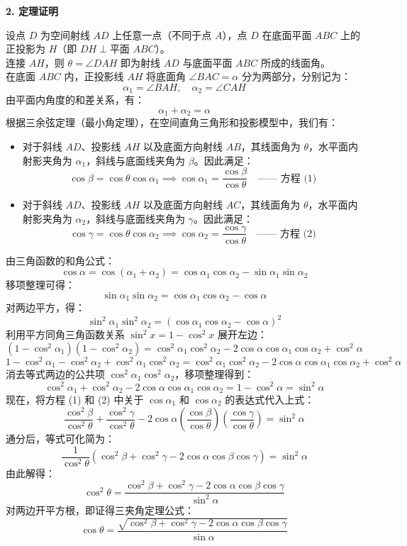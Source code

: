 \documentclass[11pt,a4paper]{ctexart}
\begin{document}
\noindent\textbf{2. 定理证明}\par
设点 $D$ 为空间射线 $AD$ 上任意一点（不同于点 $A$），点 $D$ 在底面平面 $ABC$ 上的正投影为 $H$（即 $DH \perp \text{平面 } ABC$）。\\
连接 $AH$，则 $\theta = \angle DAH$ 即为射线 $AD$ 与底面平面 $ABC$ 所成的线面角。\\
在底面 $ABC$ 内，正投影线 $AH$ 将底面角 $\angle BAC = \alpha$ 分为两部分，分别记为：
\[ \alpha_1 = \angle BAH, \quad \alpha_2 = \angle CAH \]
由平面内角度的和差关系，有：
\[ \alpha_1 + \alpha_2 = \alpha \]
根据三余弦定理（最小角定理），在空间直角三角形和投影模型中，我们有：
\begin{itemize}
    \item 对于斜线 $AD$、投影线 $AH$ 以及底面方向射线 $AB$，其线面角为 $\theta$，水平面内射影夹角为 $\alpha_1$，斜线与底面线夹角为 $\beta$。因此满足：
    \[ \cos\beta = \cos\theta \cos\alpha_1 \implies \cos\alpha_1 = \frac{\cos\beta}{\cos\theta} \quad \text{—— 方程 (1)} \]
    \item 对于斜线 $AD$、投影线 $AH$ 以及底面方向射线 $AC$，其线面角为 $\theta$，水平面内射影夹角为 $\alpha_2$，斜线与底面线夹角为 $\gamma$。因此满足：
    \[ \cos\gamma = \cos\theta \cos\alpha_2 \implies \cos\alpha_2 = \frac{\cos\gamma}{\cos\theta} \quad \text{—— 方程 (2)} \]
\end{itemize}
由三角函数的和角公式：
\[ \cos\alpha = \cos(\alpha_1 + \alpha_2) = \cos\alpha_1 \cos\alpha_2 - \sin\alpha_1 \sin\alpha_2 \]
移项整理可得：
\[ \sin\alpha_1 \sin\alpha_2 = \cos\alpha_1 \cos\alpha_2 - \cos\alpha \]
对两边平方，得：
\[ \sin^2\alpha_1 \sin^2\alpha_2 = (\cos\alpha_1 \cos\alpha_2 - \cos\alpha)^2 \]
利用平方同角三角函数关系 $\sin^2 x = 1 - \cos^2 x$ 展开左边：
\[ (1 - \cos^2\alpha_1)(1 - \cos^2\alpha_2) = \cos^2\alpha_1 \cos^2\alpha_2 - 2\cos\alpha \cos\alpha_1 \cos\alpha_2 + \cos^2\alpha \]
\[ 1 - \cos^2\alpha_1 - \cos^2\alpha_2 + \cos^2\alpha_1 \cos^2\alpha_2 = \cos^2\alpha_1 \cos^2\alpha_2 - 2\cos\alpha \cos\alpha_1 \cos\alpha_2 + \cos^2\alpha \]
消去等式两边的公共项 $\cos^2\alpha_1 \cos^2\alpha_2$，移项整理得到：
\[ \cos^2\alpha_1 + \cos^2\alpha_2 - 2\cos\alpha \cos\alpha_1 \cos\alpha_2 = 1 - \cos^2\alpha = \sin^2\alpha \]
现在，将方程 (1) 和 (2) 中关于 $\cos\alpha_1$ 和 $\cos\alpha_2$ 的表达式代入上式：
\[ \frac{\cos^2\beta}{\cos^2\theta} + \frac{\cos^2\gamma}{\cos^2\theta} - 2\cos\alpha \left(\frac{\cos\beta}{\cos\theta}\right) \left(\frac{\cos\gamma}{\cos\theta}\right) = \sin^2\alpha \]
通分后，等式可化简为：
\[ \frac{1}{\cos^2\theta} \left( \cos^2\beta + \cos^2\gamma - 2\cos\alpha \cos\beta \cos\gamma \right) = \sin^2\alpha \]
由此解得：
\[ \cos^2\theta = \frac{\cos^2\beta + \cos^2\gamma - 2\cos\alpha \cos\beta \cos\gamma}{\sin^2\alpha} \]
对两边开平方根，即证得三夹角定理公式：
\[ \cos\theta = \frac{\sqrt{\cos^2\beta + \cos^2\gamma - 2\cos\alpha \cos\beta \cos\gamma}}{\sin\alpha} \]
\end{document}
